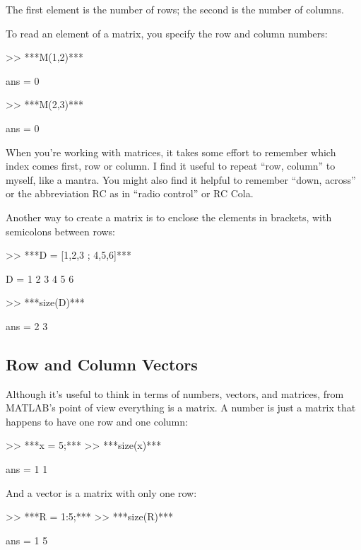 The first element is the number of rows; the second is the number of
columns.


To read an element of a matrix, you specify the row and column \mbox{numbers}:

\begin{code}
>> ***M(1,2)***

ans = 0

>> ***M(2,3)***

ans = 0
\end{code}

When you're working with matrices, it takes some effort to remember
which index comes first, row or column.  I find it useful to repeat
``row, column'' to myself, like a mantra.  You might also find it
helpful to remember ``down, across'' or the abbreviation RC as in ``radio control'' or RC Cola.

Another way to create a matrix is to enclose the elements in
brackets, with semicolons between rows:

\begin{code}
>> ***D = [1,2,3 ; 4,5,6]***

D =  1     2     3
     4     5     6

>> ***size(D)***

ans = 2     3
\end{code}


\subsection{Row and Column Vectors}
\label{rowvector}


Although it's useful to think in terms of numbers, vectors, and matrices,
from MATLAB's point of view everything is a matrix.  A number
is just a matrix that happens to have one row and one column:

\begin{code}
>> ***x = 5;***
>> ***size(x)***

ans = 1     1
\end{code}

And a vector is a matrix with only one row:

\begin{code}
>> ***R = 1:5;***
>> ***size(R)***

ans = 1     5
\end{code}

